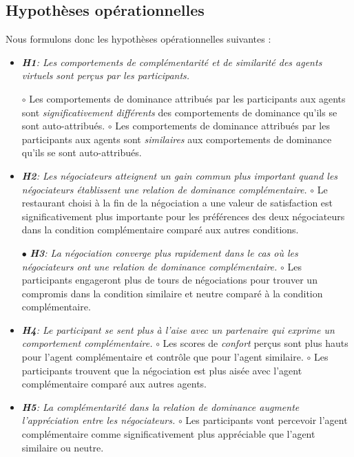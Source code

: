 	\subsection{Hypothèses opérationnelles}
	Nous formulons donc les hypothèses opérationnelles suivantes :
	\begin{itemize}
		\item\textit{\textbf{H1}: Les comportements de complémentarité et de similarité des agents virtuels sont perçus par les participants.}
		
			\subitem $\circ$  Les comportements de dominance attribués par les participants aux agents sont \textit{significativement différents} des comportements de dominance qu'ils se sont auto-attribués.
			\subitem $\circ$ Les comportements de dominance attribués par les participants aux agents sont \textit{similaires} aux comportements de dominance qu'ils se sont auto-attribués.
		
		\item \textit{ \textbf{H2}: Les négociateurs atteignent un gain commun plus important quand les négociateurs établissent une relation de dominance complémentaire.}
			\subitem $\circ$ Le restaurant choisi à la fin de la négociation a une valeur de satisfaction  est significativement plus importante pour les préférences des deux négociateurs dans la condition complémentaire comparé aux autres conditions. 
			
		\item [$\bullet$] \textit{\textbf{H3}: La négociation converge plus rapidement dans le cas où les négociateurs ont une relation de dominance complémentaire.}
			\subitem $\circ$ Les participants engageront plus de tours de négociations pour trouver un compromis dans la condition similaire et neutre comparé à la condition complémentaire.
		
		\item  \textit{\textbf{H4}: Le participant se sent plus à l'aise avec un partenaire qui exprime un comportement complémentaire.}
			\subitem $\circ$ Les scores de \emph{confort} perçus sont plus hauts pour l'agent complémentaire et contrôle que pour l'agent similaire.
			\subitem $\circ$ Les participants trouvent que la négociation est plus aisée avec l'agent complémentaire comparé aux autres agents.
		\item  \textit{\textbf{H5}: La complémentarité dans la relation de dominance augmente l'appréciation entre les négociateurs.}
			\subitem $\circ$ Les participants vont percevoir l'agent complémentaire comme significativement plus appréciable que l'agent similaire ou neutre.
		
	\end{itemize}
	
